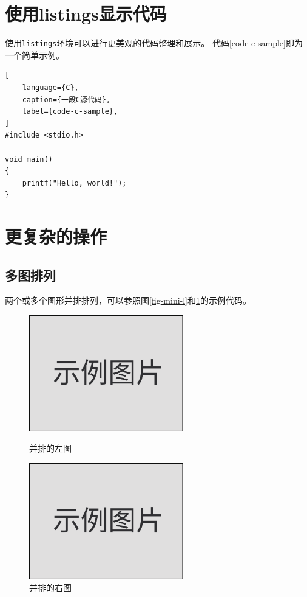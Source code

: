 \section{使用listings显示代码}
\label{sec-listings}
使用\texttt{listings}环境可以进行更美观的代码整理和展示。
代码\ref{code-c-sample}即为一个简单示例。
\begin{lstlisting}[
    language={C},
    caption={一段C源代码},
    label={code-c-sample},
]
#include <stdio.h>

void main()
{
    printf("Hello, world!");
}
\end{lstlisting}

\section{更复杂的操作}
\label{sec-more}

\subsection{多图排列}
\label{subsec-multi-fig}
两个或多个图形并排排列，可以参照图\ref{fig-mini-l}和\ref{fig-mini-r}的示例代码。
\begin{figure}[h!] %
    \begin{minipage}{.5\textwidth} %
        \centering
        \includegraphics[width=0.6\textwidth]{figure/image.pdf}
        \caption{并排的左图}
        \label{fig-mini-l}
    \end{minipage}
    \begin{minipage}{.5\textwidth}
        \centering
        \includegraphics[width=0.6\textwidth]{figure/image.pdf}
        \caption{并排的右图}
        \label{fig-mini-r}
    \end{minipage}
\end{figure}

